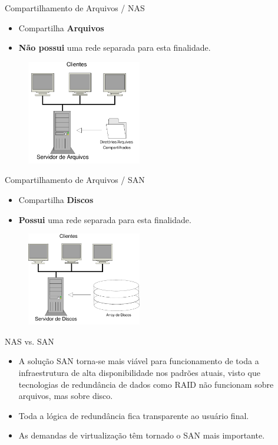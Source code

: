 \documentclass{beamer}
\begin{document}
\begin{frame}{Compartilhamento de Arquivos / NAS}
\begin{itemize}
	\item Compartilha \textbf{Arquivos}
	\item \textbf{Não possui} uma rede separada para esta finalidade.
\end{itemize}
\begin{figure}[h]
\centering
\includegraphics[width=5cm]{img/nas.pdf} 
 \label{fig-nas}
\end{figure}
\end{frame}


\begin{frame}{Compartilhamento de Arquivos / SAN}
\begin{itemize}
	\item Compartilha \textbf{Discos}
	\item \textbf{Possui} uma rede separada para esta finalidade.
\end{itemize}
\begin{figure}[h]
	\centering
	\includegraphics[width=5cm]{img/san.pdf} 
	 \label{fig-nas}
\end{figure}
\end{frame}


\begin{frame}{NAS vs. SAN}
\begin{itemize}[<+->]
	\item A solução SAN torna-se mais viável para funcionamento de toda a infraestrutura de alta disponibilidade nos padrões atuais, visto que tecnologias de redundância de dados como RAID não funcionam sobre arquivos, mas sobre disco.
	\item Toda a lógica de redundância fica transparente ao usuário final.
	\item As demandas de virtualização têm tornado o SAN mais importante.
\end{itemize}
\end{frame}
\end{document}
